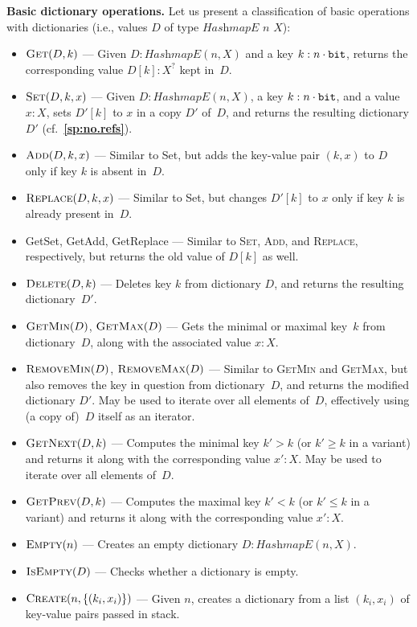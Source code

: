 \documentclass[12pt,oneside]{article}
\def\makepoint#1{\medbreak\noindent{\bf #1.\ }}
\def\nxsubpoint{\refstepcounter{subsubsection}%
    \smallbreak\makepoint{\thesubsubsection}}
\def\refpoint#1{{\rm\textbf{\ref{#1}}}}
\let\ptref=\refpoint
\def\emb#1{\textbf{#1.}}
\let\tp=\textit
\def\HashmapE{\tp{HashmapE}}
\begin{document}
\nxsubpoint\label{sp:dict.ops}\emb{Basic dictionary operations}
Let us present a classification of basic operations with dictionaries (i.e., values $D$ of type $\HashmapE$ $n$ $X$):
\begin{itemize}
\item $\textsc{Get}(D,k)$ --- Given $D:\HashmapE(n,X)$ and a key $k:n\cdot{\tt bit}$, returns the corresponding value $D[k]:X^?$ kept in~$D$.
\item $\textsc{Set}(D,k,x)$ --- Given $D:\HashmapE(n,X)$, a key $k:n\cdot{\tt bit}$, and a value $x:X$, sets $D'[k]$ to $x$ in a copy $D'$ of~$D$, and returns the resulting dictionary $D'$ (cf.~\ptref{sp:no.refs}).
\item $\textsc{Add}(D,k,x)$ --- Similar to {\sc Set}, but adds the key-value pair $(k,x)$ to $D$ only if key $k$ is absent in~$D$.
\item $\textsc{Replace}(D,k,x)$ --- Similar to {\sc Set}, but changes $D'[k]$ to $x$ only if key $k$ is already present in~$D$.
\item {\sc GetSet}, {\sc GetAdd}, {\sc GetReplace} --- Similar to \textsc{Set}, \textsc{Add}, and \textsc{Replace}, respectively, but returns the old value of $D[k]$ as well.
\item $\textsc{Delete}(D,k)$ --- Deletes key $k$ from dictionary $D$, and returns the resulting dictionary~$D'$.
\item $\textsc{GetMin}(D)$, $\textsc{GetMax}(D)$ --- Gets the minimal or maximal key~$k$ from dictionary~$D$, along with the associated value $x:X$.
\item $\textsc{RemoveMin}(D)$, $\textsc{RemoveMax}(D)$ --- Similar to \textsc{GetMin} and \textsc{GetMax}, but also removes the key in question from dictionary~$D$, and returns the modified dictionary $D'$. May be used to iterate over all elements of~$D$, effectively using (a copy of)~$D$ itself as an iterator.
\item $\textsc{GetNext}(D,k)$ --- Computes the minimal key $k'>k$ (or $k'\geq k$ in a variant) and returns it along with the corresponding value $x':X$. May be used to iterate over all elements of~$D$.
\item $\textsc{GetPrev}(D,k)$ --- Computes the maximal key $k'<k$ (or $k'\leq k$ in a variant) and returns it along with the corresponding value $x':X$.
\item $\textsc{Empty}(n)$ --- Creates an empty dictionary $D:\HashmapE(n,X)$.
\item $\textsc{IsEmpty}(D)$ --- Checks whether a dictionary is empty.
\item $\textsc{Create}(n,\{(k_i,x_i)\})$ --- Given $n$, creates a dictionary from a list ${(k_i,x_i)}$ of key-value pairs passed in stack.

\end{itemize}
\end{document}
